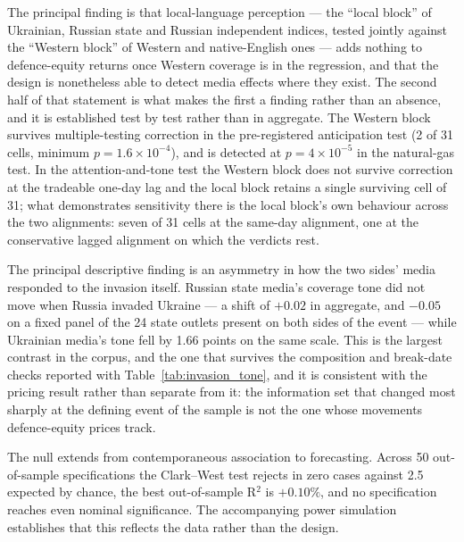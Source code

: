 \documentclass[12pt,a4paper]{article}
\begin{document}
The principal finding is that local-language perception --- the ``local block'' of Ukrainian, Russian state and Russian independent indices, tested jointly against the ``Western block'' of Western and native-English ones --- adds nothing to defence-equity returns once Western coverage is in the regression, and that the design is nonetheless able to detect media effects where they exist. The second half of that statement is what makes the first a finding rather than an absence, and it is established test by test rather than in aggregate. The Western block survives multiple-testing correction in the pre-registered anticipation test (2 of 31 cells, minimum $p = 1.6\times10^{-4}$), and is detected at $p = 4\times10^{-5}$ in the natural-gas test. In the attention-and-tone test the Western block does not survive correction at the tradeable one-day lag and the local block retains a single surviving cell of 31; what demonstrates sensitivity there is the local block's own behaviour across the two alignments: seven of 31 cells at the same-day alignment, one at the conservative lagged alignment on which the verdicts rest.

The principal descriptive finding is an asymmetry in how the two sides' media responded to the invasion itself. Russian state media's coverage tone did not move when Russia invaded Ukraine --- a shift of $+0.02$ in aggregate, and $-0.05$ on a fixed panel of the 24 state outlets present on both sides of the event --- while Ukrainian media's tone fell by 1.66 points on the same scale. This is the largest contrast in the corpus, and the one that survives the composition and break-date checks reported with Table~\ref{tab:invasion_tone}, and it is consistent with the pricing result rather than separate from it: the information set that changed most sharply at the defining event of the sample is not the one whose movements defence-equity prices track.

The null extends from contemporaneous association to forecasting. Across 50 out-of-sample specifications the Clark--West test rejects in zero cases against 2.5 expected by chance, the best out-of-sample R$^2$ is $+0.10\%$, and no specification reaches even nominal significance. The accompanying power simulation establishes that this reflects the data rather than the design.
\end{document}
